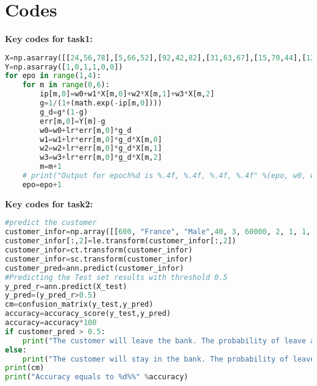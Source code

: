 \documentclass{article}
\begin{document}
\section*{Codes}
\textbf{Key codes for task1:}
\begin{lstlisting}[language=python]
X=np.asarray([[24,56,78],[5,66,52],[92,42,82],[31,63,67],[15,70,44],[12,45,35]])
Y=np.asarray([1,0,1,1,0,0])
for epo in range(1,4):
    for m in range(0,6):
        ip[m,0]=w0+w1*X[m,0]+w2*X[m,1]+w3*X[m,2]
        g=1/(1+(math.exp(-ip[m,0])))
        g_d=g*(1-g)
        err[m,0]=Y[m]-g
        w0=w0+lr*err[m,0]*g_d
        w1=w1+lr*err[m,0]*g_d*X[m,0]
        w2=w2+lr*err[m,0]*g_d*X[m,1]
        w3=w3+lr*err[m,0]*g_d*X[m,2]
        m=m+1
    # print("Output for epoch%d is %.4f, %.4f, %.4f, %.4f" %(epo, w0, w1, w2, w3))
    epo=epo+1
\end{lstlisting}
\textbf{Key codes for task2:}
\begin{lstlisting}[language=python]
#predict the customer
customer_infor=np.array([[600, "France", "Male",40, 3, 60000, 2, 1, 1, 50000]])
customer_infor[:,2]=le.transform(customer_infor[:,2])
customer_infor=ct.transform(customer_infor)
customer_infor=sc.transform(customer_infor)
customer_pred=ann.predict(customer_infor)
#Predicting the Test set results with threshold 0.5
y_pred_r=ann.predict(X_test)
y_pred=(y_pred_r>0.5)
cm=confusion_matrix(y_test,y_pred)
accuracy=accuracy_score(y_test,y_pred)
accuracy=accuracy*100
if customer_pred > 0.5:
    print("The customer will leave the bank. The probability of leave about the customer is %f." %customer_pred)
else:
    print("The customer will stay in the bank. The probability of leave about the customer is %f." %customer_pred)
print(cm)
print("Accuracy equals to %d%%" %accuracy)
\end{lstlisting}
\end{document}
